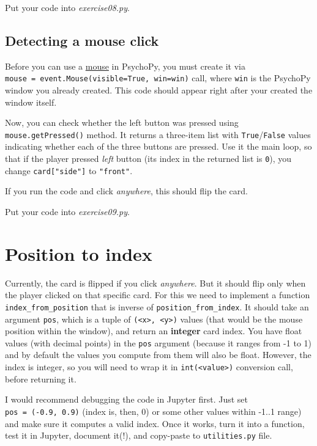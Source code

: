 \documentclass[
]{book}
\begin{document}
Put your code into \emph{exercise08.py}.

\hypertarget{detecting-a-mouse-click}{%
\subsection{Detecting a mouse click}\label{detecting-a-mouse-click}}

Before you can use a \href{https://psychopy.org/api/event.html\#psychopy.event.Mouse}{mouse} in PsychoPy, you must create it via \texttt{mouse\ =\ event.Mouse(visible=True,\ win=win)} call, where \texttt{win} is the PsychoPy window you already created. This code should appear right after your created the window itself.

Now, you can check whether the left button was pressed using \texttt{mouse.getPressed()} method. It returns a three-item list with \texttt{True}/\texttt{False} values indicating whether each of the three buttons are pressed. Use it the main loop, so that if the player pressed \emph{left} button (its index in the returned list is \texttt{0}), you change \texttt{card{[}"side"{]}} to \texttt{"front"}.

If you run the code and click \emph{anywhere}, this should flip the card.

Put your code into \emph{exercise09.py}.

\hypertarget{position-to-index}{%
\section{Position to index}\label{position-to-index}}

Currently, the card is flipped if you click \emph{anywhere}. But it should flip only when the player clicked on that specific card. For this we need to implement a function \texttt{index\_from\_position} that is inverse of \texttt{position\_from\_index}. It should take an argument \texttt{pos}, which is a tuple of \texttt{(\textless{}x\textgreater{},\ \textless{}y\textgreater{})} values (that would be the mouse position within the window), and return an \textbf{integer} card index. You have float values (with decimal points) in the \texttt{pos} argument (because it ranges from -1 to 1) and by default the values you compute from them will also be float. However, the index is integer, so you will need to wrap it in \texttt{int(\textless{}value\textgreater{})} conversion call, before returning it.

I would recommend debugging the code in Jupyter first. Just set \texttt{pos\ =\ (-0.9,\ 0.9)} (index is, then, 0) or some other values within -1..1 range) and make sure it computes a valid index. Once it works, turn it into a function, test it in Jupyter, document it(!), and copy-paste to \texttt{utilities.py} file.
\end{document}
